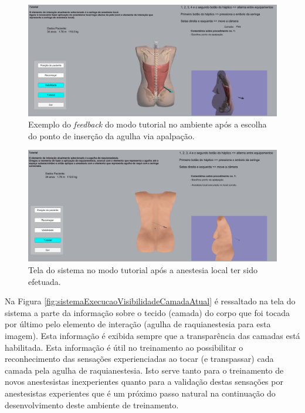 \begin{figure}[ht!]
    \centering
    \includegraphics[width=\textwidth]{capitulos/figuras/sistemaExecucaoTutorialAnestesiaLocal.png} 
    \caption{Exemplo do \textit{feedback} do modo tutorial no ambiente após a escolha do ponto de inserção da agulha via apalpação.}
    \label{fig:sistemaExecucaoTutorialAnestesiaLocal}
\end{figure}

\begin{figure}[ht!]
    \centering
    \includegraphics[width=\textwidth]{capitulos/figuras/sistemaExecucaoTutorialRaqui.png} 
    \caption{Tela do sistema no modo tutorial após a anestesia local ter sido efetuada.}
    \label{fig:sistemaExecucaoTutorialRaqui}
\end{figure}

Na Figura \ref{fig:sistemaExecucaoVisibilidadeCamadaAtual} é ressaltado na tela do sistema a parte da informação sobre o tecido (camada) do corpo que foi tocada por último pelo elemento de interação (agulha de raquianestesia para esta imagem). Esta informação é exibida sempre que a transparência das camadas está habilitada. Esta informação é útil no treinamento ao possibilitar o reconhecimento das sensações experienciadas ao tocar (e transpassar) cada camada pela agulha de raquianestesia. Isto serve tanto para o treinamento de novos anestesistas inexperientes quanto para a validação destas sensações por anestesistas experientes que é um próximo passo natural na continuação do desenvolvimento deste ambiente de treinamento.

